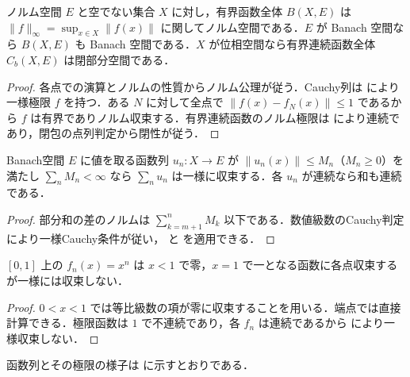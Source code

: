 \begin{prop}[一様ノルムと有界函数空間]
ノルム空間 $E$ と空でない集合 $X$ に対し，有界函数全体 $B(X,E)$ は $\|f\|_\infty=\sup_{x\in X}\|f(x)\|$ に関してノルム空間である．$E$ が Banach 空間なら $B(X,E)$ も Banach 空間である．$X$ が位相空間なら有界連続函数全体 $C_b(X,E)$ は閉部分空間である．
\end{prop}
\begin{proof}
各点での演算とノルムの性質からノルム公理が従う．Cauchy列は  により一様極限 $f$ を持つ．ある $N$ に対して全点で $\|f(x)-f_N(x)\|\leq1$ であるから $f$ は有界でありノルム収束する．有界連続函数のノルム極限は  により連続であり，閉包の点列判定から閉性が従う．
\end{proof}
\begin{prop}[Weierstrassの優級数判定]
Banach空間 $E$ に値を取る函数列 $u_n:X\to E$ が $\|u_n(x)\|\leq M_n$（$M_n\geq0$）を満たし $\sum_n M_n<\infty$ なら $\sum_nu_n$ は一様に収束する．各 $u_n$ が連続なら和も連続である．
\end{prop}
\begin{proof}
部分和の差のノルムは $\sum_{k=m+1}^nM_k$ 以下である．数値級数のCauchy判定により一様Cauchy条件が従い， と  を適用できる．
\end{proof}
\begin{example}[各点収束と一様収束の相違]
$[0,1]$ 上の $f_n(x)=x^n$ は $x<1$ で零，$x=1$ で一となる函数に各点収束するが一様には収束しない．
\end{example}
\begin{proof}
$0<x<1$ では等比級数の項が零に収束することを用いる．端点では直接計算できる．極限函数は $1$ で不連続であり，各 $f_n$ は連続であるから  により一様収束しない．
\end{proof}
函数列とその極限の様子は  に示すとおりである．
